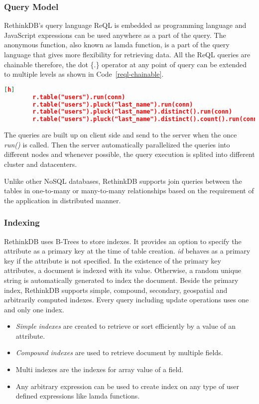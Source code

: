 \subsubsection{Query Model}
RethinkDB's query language ReQL is embedded as programming language and JavaScript expressions can be used anywhere as a part of the query. The anonymous function, also known as lamda function, is a part of the query language that gives more flexibility for retrieving data. All the ReQL queries are chainable therefore, the dot \{.\} operator at any point of query can be extended to multiple levels as shown in Code~\ref{reql-chainable}.
	\begin{lstlisting}[language=JSON,caption=Chainable Query in ReQL, label=reql-chainable, xleftmargin=-40pt][h]
		r.table("users").run(conn)
		r.table("users").pluck("last_name").run(conn)
		r.table("users").pluck("last_name").distinct().run(conn)
		r.table("users").pluck("last_name").distinct().count().run(conn)
	\end{lstlisting} 
The queries are built up on client side and send to the server when the once \textit{run()} is called. Then the server automatically parallelized the queries into different nodes and whenever possible, the query execution is splited into different cluster and datacenters.
\par
Unlike other NoSQL databases, RethinkDB supports join queries between the tables in one-to-many or many-to-many relationships based on the requirement of the application in distributed manner. 
\subsubsection{Indexing}
	RethinkDB uses B-Trees to store indexes. It provides an option to specify the attribute as a primary key at the time of table creation. \textit{id} behaves as a primary key if the attribute is not specified. In the existence of the primary key attributes, a document is indexed with its value. Otherwise, a random unique string is automatically generated to index the document.  Beside the primary index, RethinkDB supports simple, compound, secondary, geospatial  and arbitrarily computed indexes. Every query including update operations uses one and only one index. 
	\begin{itemize}
		\item \textit{Simple indexes} are created to retrieve or sort efficiently by a value of an attribute.
		\item \textit{Compound indexes} are used to retrieve document by multiple fields. 
		\item Multi indexes are the indexes for array value of a field. 
		\item Any arbitrary expression can be used to create index on any type of user defined expressions like lamda functions.
	\end{itemize}